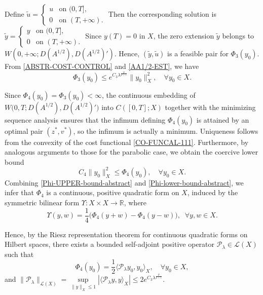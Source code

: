 \documentclass[a4paper]{article}
\numberwithin{equation}{section}
\begin{document}
Define $\widetilde{u} = \begin{cases} u & \text{on } (0,T], \\ 0 & \text{on } (T,+\infty). \end{cases}$ Then the corresponding solution is $\widetilde{y} = \begin{cases} y & \text{on } (0,T], \\ 0 & \text{on } (T,+\infty). \end{cases}$ Since $y(T)=0$ in $X$, the zero extension $\widetilde y$ belongs to $W(0,+\infty;D(A^{1/2}),D(A^{1/2})')$. Hence, $(\widetilde y,\widetilde u)$ is a feasible pair for $\Phi_3(y_0)$. From \eqref{ABSTR-COST-CONTROL} and \eqref{AA1/2-EST}, we have
\begin{equation}\label{Phi-UPPER-bound-abstract}
\Phi_3(y_0)\le e^{ C_3\lambda^{\frac{p}{p+1}}}\|y_0\|_X^2,\quad \forall y_0\in X.
\end{equation}

Since $ \Phi_4(y_0)=\Phi_3(y_0)<\infty$, the continuous embedding of $W\big(0,T;D(A^{1/2}),D(A^{1/2})'\big)$ into $C([0,T];X)$ together with the minimizing sequence analysis ensures that the infimum defining $\Phi_4(y_0)$ is attained by an optimal pair $(z^*,v^*)$, so the infimum is actually a minimum. Uniqueness follows from the convexity of the cost functional \eqref{CO-FUNCAL-111}. Furthermore, by analogous arguments to those for the parabolic case, we obtain the coercive lower bound
\begin{equation}\label{Phi-lower-bound-abstract}
C_4\|y_0\|_X^2\le \Phi_4(y_0),\quad \forall y_0\in X.
\end{equation}
Combining \eqref{Phi-UPPER-bound-abstract} and \eqref{Phi-lower-bound-abstract}, we infer that $\Phi_4$ is a continuous, positive quadratic form on $X$, induced by the symmetric bilinear form $\Upsilon\colon X\times X\to\mathbb{R}$, where
$$\Upsilon(y,w)=\frac14\big(\Phi_4(y+w)-\Phi_4(y-w)\big),\;\;\forall y,w\in X.$$

Hence, by the Riesz representation theorem for continuous quadratic forms on Hilbert spaces, there exists a bounded self-adjoint positive operator $\mathcal P_\lambda\in\mathcal L(X)$ such that
\begin{equation}\label{Phi-representation-abstract}
\Phi_4(y_0)=\frac12\langle\mathcal P_\lambda y_0,y_0\rangle_X,\quad \forall y_0\in X,
\end{equation}
and $\|\mathcal P_\lambda\|_{\mathcal L(X)}=\sup\limits_{\|y\|_X\le 1}|\langle \mathcal P_\lambda y,y\rangle_{X}|\le 2e^{C_3\lambda^{\frac{p}{p+1}}}.$
\end{document}
